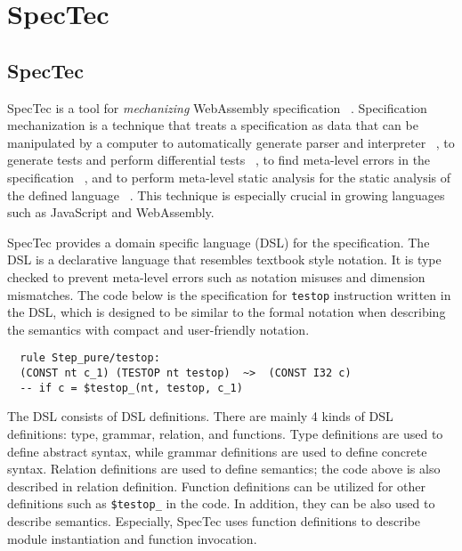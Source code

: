 
\chapter{SpecTec}
\label{ch:spectec}
\noindent










\section{SpecTec}
\label{sec:spectec}


SpecTec is a tool for \textit{mechanizing} WebAssembly specification
~\cite{spectec}.
Specification mechanization is a technique that treats a specification as data
that can be manipulated by a computer to automatically generate parser and
interpreter ~\cite{jiset}, to generate tests and perform differential tests
~\cite{jest}, to find meta-level errors in the specification ~\cite{jstar}, and
to perform meta-level static analysis for the static analysis of the defined
language ~\cite{jsaver}.
This technique is especially crucial in growing languages such as JavaScript
and WebAssembly.


SpecTec provides a domain specific language (DSL) for the specification.
The DSL is a declarative language that resembles textbook style notation.
It is type checked to prevent meta-level errors such as notation misuses and
dimension mismatches. The code below is the specification for \texttt{testop}
instruction written in the DSL, which is designed to be similar to the formal
notation when describing the semantics with compact and user-friendly
notation.
\\
\begin{verbatim}
  rule Step_pure/testop:
  (CONST nt c_1) (TESTOP nt testop)  ~>  (CONST I32 c)
  -- if c = $testop_(nt, testop, c_1)
\end{verbatim}


The DSL consists of DSL definitions.
There are mainly 4 kinds of DSL definitions: type, grammar, relation, and
functions.
Type definitions are used to define abstract syntax, while grammar definitions
are used to define concrete syntax.
Relation definitions are used to define semantics; the code above is also
described in relation definition.
Function definitions can be utilized for other definitions such as
\texttt{\$testop\_} in the code.
In addition, they can be also used to describe semantics.
Especially, SpecTec uses function definitions to describe module instantiation
and function invocation.


